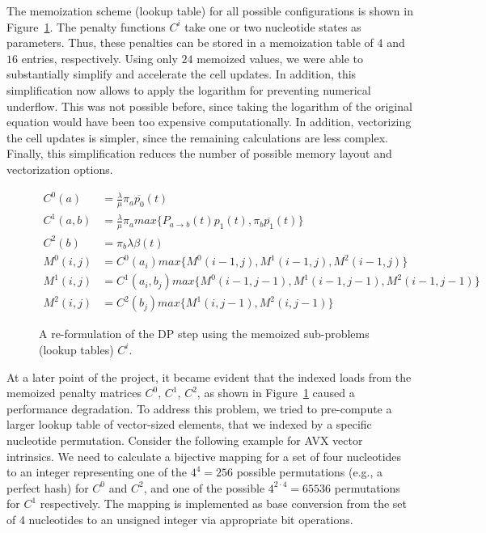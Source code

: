 \documentclass[runningheads,a4paper]{llncs}
\begin{document}
The memoization scheme (lookup table) for all possible configurations is shown in Figure~\ref{fig:memo}.
The penalty functions $C^i$ take one or two nucleotide states as parameters.
Thus, these penalties can be stored in a memoization table of $4$ and $16$ entries, respectively.
Using only $24$ memoized values, we were able to substantially simplify and accelerate the cell updates.
In addition, this simplification now allows to apply the logarithm for preventing numerical underflow.
This was not possible before, since taking the logarithm of the original equation would have been too expensive computationally.
In addition, vectorizing the cell updates is simpler, since the remaining calculations are less complex.
Finally, this simplification reduces the number of possible memory layout and vectorization options.

\begin{figure}
\[
\begin{aligned}
  C^0(a)&=\frac{\lambda}{\mu}\pi_{a}\overline{p_0}(t)\\
  C^1(a, b)&=\frac{\lambda}{\mu}\pi_{a}max\{P_{a \rightarrow b}(t) p_1(t), \pi_{b}\overline{p_1}(t)\}\\
  C^2(b)&=\pi_{b}\lambda\beta(t)\\
  M^0(i,j)&=C^0(a_i)max\{M^0(i-1, j), M^1(i-1,j), M^2(i-1,j)\}\\
  M^1(i,j)&=C^1(a_i,b_j)max\{M^0(i-1, j-1), M^1(i-1,j-1), M^2(i-1,j-1)\}\\
  M^2(i,j)&=C^2(b_j)max\{M^1(i,j-1), M^2(i,j-1)\}
\end{aligned}
\]
\caption{A re-formulation of the DP step using the memoized sub-problems (lookup tables) $C^i$.}
\label{fig:memo}
\end{figure}

At a later point of the project, it became evident that the indexed loads from the memoized penalty matrices $C^0$, $C^1$, $C^2$, as shown in Figure~\ref{fig:memo}
caused a performance degradation.
To address this problem, we tried to pre-compute a larger lookup table of vector-sized elements, that we indexed by a specific nucleotide permutation.
Consider the following example for AVX vector intrinsics.
We need to calculate a bijective mapping for a set of four nucleotides to an integer representing one of the $4^4 = 256$ possible permutations (e.g., a perfect hash)
for $C^0$ and $C^2$, and one of the possible $4^{2 \cdot 4} = 65536$ permutations for $C^1$ respectively.
The mapping is implemented as base conversion from the set of 4 nucleotides to an unsigned integer via appropriate bit operations.
\end{document}
